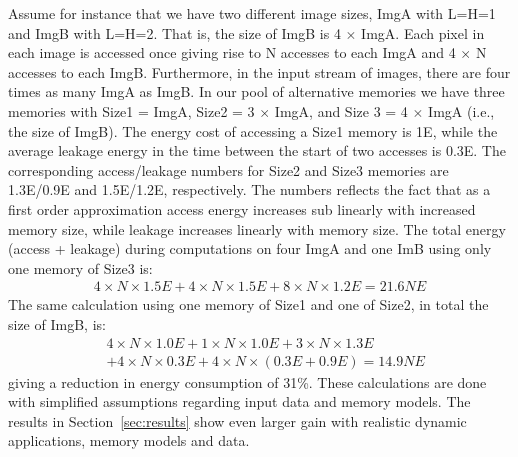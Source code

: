 \documentclass[a4paper,conference]{IEEEtran}
\begin{document}
Assume for instance that we have two different image sizes, ImgA with L=H=1 and ImgB with L=H=2. That is, the size of ImgB is 4 $\times$ ImgA. Each pixel in each image is accessed once giving rise to N accesses to each ImgA and 4 $\times$ N accesses to each ImgB. Furthermore, in the input stream of images, there are four times as many ImgA as ImgB. In our pool of alternative memories we have three memories with Size1 = ImgA, Size2  = 3 $\times$ ImgA, and Size 3 = 4 $\times$ ImgA (i.e., the size of ImgB). The energy cost of accessing a Size1 memory is 1E, while the average leakage energy in the time between the start of two accesses is 0.3E. The corresponding access/leakage numbers for Size2 and Size3 memories are 1.3E/0.9E and 1.5E/1.2E, respectively. The numbers reflects the fact that as a first order approximation access energy increases sub linearly with increased memory size, while leakage increases linearly with memory size. The total energy (access + leakage) during computations on four ImgA and one ImB using only one memory of Size3 is:
\begin{align*}
4 \times N \times 1.5E + 4 \times N \times 1.5E + 8 \times N \times 1.2E = 21.6NE
\end{align*}
The same calculation using one memory of Size1 and one of Size2, in total the size of ImgB, is: 
\begin{align*}
& 4 \times N \times 1.0E + 1 \times N \times 1.0E + 3 \times N \times 1.3E \\
& + 4 \times N \times 0.3E + 4 \times N \times (0.3E + 0.9E) =  14.9NE
\end{align*}
giving a reduction in energy consumption of 31\%. 
These calculations are done with simplified assumptions regarding input data and memory models. The results in Section~\ref{sec:results} show even larger gain with realistic dynamic applications, memory models and data.
\end{document}
